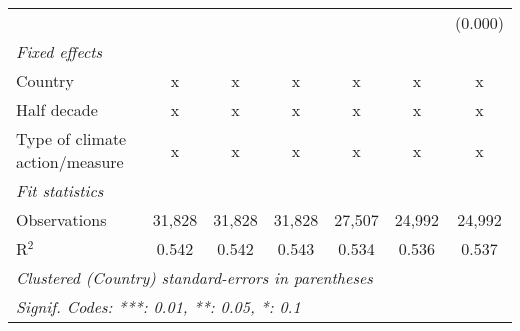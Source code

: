 \begin{tabular}{lcccccc}
                                                      &             &             &              &             &              & (0.000)\\   
   \emph{Fixed effects}\\
   Country                                            & x           & x           & x            & x           & x            & x\\  
   Half decade                                        & x           & x           & x            & x           & x            & x\\  
   Type of climate action/measure                     & x           & x           & x            & x           & x            & x\\  
   \midrule \emph{Fit statistics}\\
   Observations                                       & 31,828      & 31,828      & 31,828       & 27,507      & 24,992       & 24,992\\  
   R$^2$                                              & 0.542       & 0.542       & 0.543        & 0.534       & 0.536        & 0.537\\  
   \midrule
   \multicolumn{7}{l}{\emph{Clustered (Country) standard-errors in parentheses}}\\
   \multicolumn{7}{l}{\emph{Signif. Codes: ***: 0.01, **: 0.05, *: 0.1}}\\
\end{tabular}
\par\endgroup


